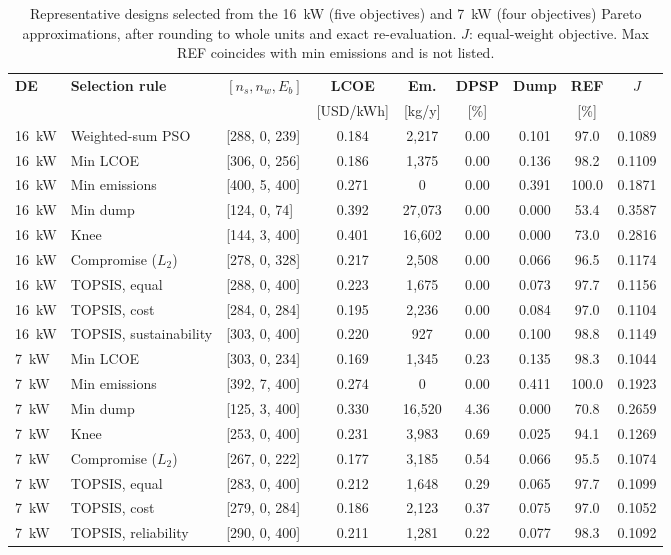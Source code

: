 \documentclass[final,3p,times]{elsarticle}
\begin{document}
\begin{table}[htbp]
\centering
\scriptsize
\setlength{\tabcolsep}{3pt}
\begin{tabular}{l l l c c c c c c}
\toprule
\textbf{DE} & \textbf{Selection rule} & \textbf{$[n_s, n_w, E_b]$} & \textbf{LCOE} & \textbf{Em.} & \textbf{DPSP} & \textbf{Dump} & \textbf{REF} & \textbf{$J$} \\
 & & & [USD/kWh] & [kg/y] & [\%] & & [\%] & \\
\midrule
16~kW & Weighted-sum PSO & [288, 0, 239] & 0.184 & 2,217 & 0.00 & 0.101 & 97.0 & 0.1089 \\
16~kW & Min LCOE & [306, 0, 256] & 0.186 & 1,375 & 0.00 & 0.136 & 98.2 & 0.1109 \\
16~kW & Min emissions & [400, 5, 400] & 0.271 & 0 & 0.00 & 0.391 & 100.0 & 0.1871 \\
16~kW & Min dump & [124, 0, 74] & 0.392 & 27,073 & 0.00 & 0.000 & 53.4 & 0.3587 \\
16~kW & Knee & [144, 3, 400] & 0.401 & 16,602 & 0.00 & 0.000 & 73.0 & 0.2816 \\
16~kW & Compromise ($L_2$) & [278, 0, 328] & 0.217 & 2,508 & 0.00 & 0.066 & 96.5 & 0.1174 \\
16~kW & TOPSIS, equal & [288, 0, 400] & 0.223 & 1,675 & 0.00 & 0.073 & 97.7 & 0.1156 \\
16~kW & TOPSIS, cost & [284, 0, 284] & 0.195 & 2,236 & 0.00 & 0.084 & 97.0 & 0.1104 \\
16~kW & TOPSIS, sustainability & [303, 0, 400] & 0.220 & 927 & 0.00 & 0.100 & 98.8 & 0.1149 \\
7~kW & Min LCOE & [303, 0, 234] & 0.169 & 1,345 & 0.23 & 0.135 & 98.3 & 0.1044 \\
7~kW & Min emissions & [392, 7, 400] & 0.274 & 0 & 0.00 & 0.411 & 100.0 & 0.1923 \\
7~kW & Min dump & [125, 3, 400] & 0.330 & 16,520 & 4.36 & 0.000 & 70.8 & 0.2659 \\
7~kW & Knee & [253, 0, 400] & 0.231 & 3,983 & 0.69 & 0.025 & 94.1 & 0.1269 \\
7~kW & Compromise ($L_2$) & [267, 0, 222] & 0.177 & 3,185 & 0.54 & 0.066 & 95.5 & 0.1074 \\
7~kW & TOPSIS, equal & [283, 0, 400] & 0.212 & 1,648 & 0.29 & 0.065 & 97.7 & 0.1099 \\
7~kW & TOPSIS, cost & [279, 0, 284] & 0.186 & 2,123 & 0.37 & 0.075 & 97.0 & 0.1052 \\
7~kW & TOPSIS, reliability & [290, 0, 400] & 0.211 & 1,281 & 0.22 & 0.077 & 98.3 & 0.1092 \\
\bottomrule
\end{tabular}
\caption{\label{tab:pareto_reps} Representative designs selected from the 16~kW (five objectives) and 7~kW (four objectives) Pareto approximations, after rounding to whole units and exact re-evaluation. $J$: equal-weight objective. Max REF coincides with min emissions and is not listed.}
\end{table}
\end{document}
